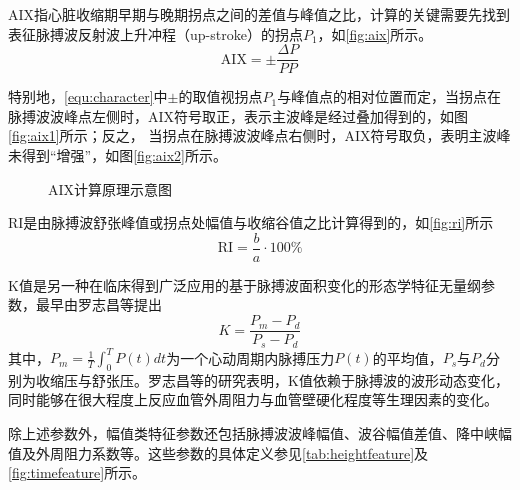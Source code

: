 AIX指心脏收缩期早期与晚期拐点之间的差值与峰值之比，计算的关键需要先找到表征脉搏波反射波上升冲程（up-stroke）的拐点$P_1$，如\autoref{fig:aix}所示\cite{Su2014}。
\begin{equation}
    \label{equ:aix}
    \text{AIX} = \pm \frac{\Delta P}{PP}
\end{equation}

特别地，\autoref{equ:character}中$\pm$的取值视拐点$P_1$与峰值点的相对位置而定，当拐点在脉搏波波峰点左侧时，AIX符号取正，表示主波峰是经过叠加得到的，如图\autoref{fig:aix1}所示；反之，
当拐点在脉搏波波峰点右侧时，AIX符号取负，表明主波峰未得到“增强”，如图\autoref{fig:aix2}所示。
\begin{figure}[htbp]
    \centering
    \quad
    \caption[AIX计算原理示意图]{\label{fig:aix}AIX计算原理示意图\cite{Su2014}}
\end{figure}

RI是由脉搏波舒张峰值或拐点处幅值与收缩谷值之比计算得到的，如\autoref{fig:ri}所示\cite{Su2014,Elgendi2012}
\begin{equation}
    \label{equ:ri}
    \text{RI} = \frac{b}{a} \cdot 100\%
\end{equation}

K值是另一种在临床得到广泛应用的基于脉搏波面积变化的形态学特征无量纲参数，最早由罗志昌等\cite{Luo1988,PPGYY}提出
\begin{equation}
    \label{equ:ppgk}
    K=\frac{P_m-P_d}{P_s-P_d}
\end{equation}
其中，$P_m=\frac{1}{T}\int_{0}^{T}P(t)dt$为一个心动周期内脉搏压力$P(t)$的平均值，$P_s$与$P_d$分别为收缩压与舒张压。罗志昌等\cite{Luo1988,PPGYY}的研究表明，K值依赖于脉搏波的波形动态变化，
同时能够在很大程度上反应血管外周阻力与血管壁硬化程度等生理因素的变化。

除上述参数外，幅值类特征参数还包括脉搏波波峰幅值、波谷幅值差值、降中峡幅值及外周阻力系数等\cite{cwl,mmt}。这些参数的具体定义参见\autoref{tab:heightfeature}及\autoref{fig:timefeature}所示。

